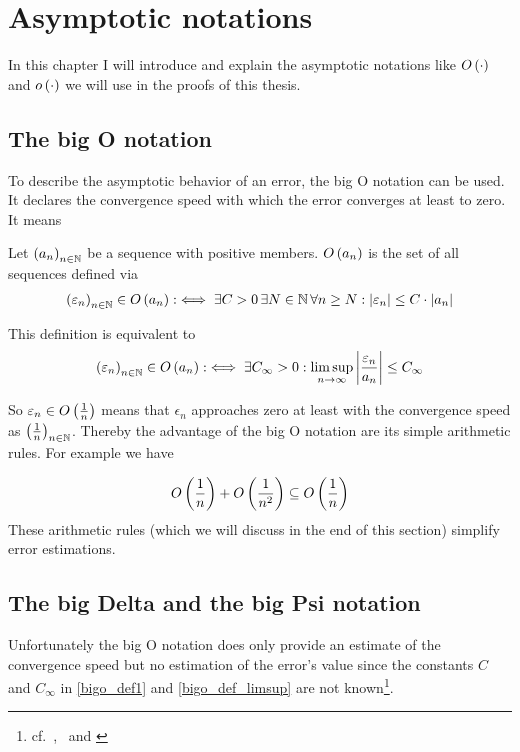 \chapter{Asymptotic notations} \label{chapter:tools}

In this chapter I will introduce and explain the asymptotic notations like $O\left( {\cdot} \right)$ and $o\left( {\cdot} \right)$ we will use in the proofs of this thesis.

\section{The big O notation}

To describe the asymptotic behavior of an error, the big O notation can be used. It declares the convergence speed with which the error converges at least to zero. It means~\cite[p.~444]{graham}\cite[p.~100]{aigner}

\begin{definition}
  Let $\left({a_n}\right)_{{n}\in\mathbb N}$ be a sequence with positive members. $O\left( {a_n} \right)$ is the set of all sequences defined via
  \begin{align} \label{bigo_def1}
    \left({\varepsilon_n}\right)_{{n}\in\mathbb N} \in O\left( {a_n} \right) :\iff \exists C > 0\, \exists N\in\mathbb N\,\forall n\ge N: \left|{\varepsilon_n}\right| \le C \cdot \left|{a_n}\right|
  \end{align}
\end{definition}

\noindent This definition is equivalent to~\cite[p.~383]{hachenberger}\cite{wiki:bigo}
\begin{align} \label{bigo_def_limsup}
  \left({\varepsilon_n}\right)_{{n}\in\mathbb N} \in O\left( {a_n} \right) :\iff \exists C_\infty > 0: \limsup_{n\to\infty} \left|{\frac{\varepsilon_n}{a_n}}\right| \le C_\infty
\end{align}

So $\varepsilon_n \in O\left( {\frac 1n} \right)$ means that $\epsilon_n$ approaches zero at least with the convergence speed as $\left({\frac 1n}\right)_{{n}\in\mathbb N}$. Thereby the advantage of the big O notation are its simple arithmetic rules. For example we have

\begin{align}
  O\left( {\frac 1n} \right) + O\left( {\frac 1{n^2}} \right) \subseteq O\left( {\frac 1n} \right)
\end{align}
These arithmetic rules (which we will discuss in the end of this section) simplify error estimations.

\section{The big Delta and the big Psi notation}
Unfortunately the big O notation does only provide an estimate of the convergence speed but no estimation of the error's value since the constants $C$ and $C_\infty$ in \eqref{bigo_def1} and \eqref{bigo_def_limsup} are not known\footnote{cf.~\cite[p.~444]{graham},~\cite{hurkyl_bigo} and \cite{templatetypedef_bigo}}.

